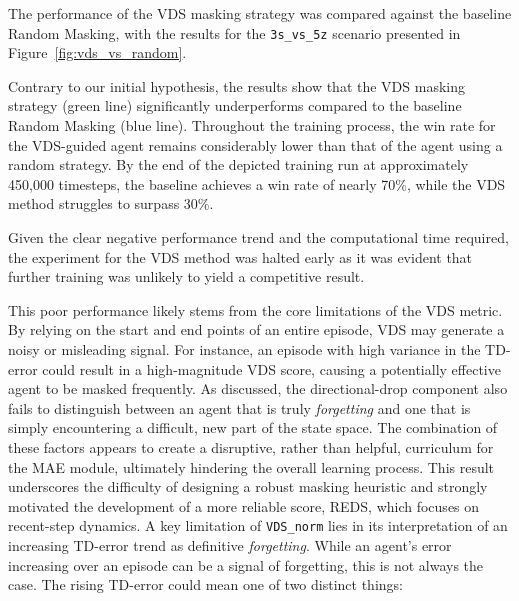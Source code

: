 The performance of the VDS masking strategy was compared against the baseline Random Masking, with the results for the \texttt{3s\_vs\_5z} scenario presented in Figure~\ref{fig:vds_vs_random}.

Contrary to our initial hypothesis, the results show that the VDS masking strategy (green line) significantly underperforms compared to the baseline Random Masking (blue line). Throughout the training process, the win rate for the VDS-guided agent remains considerably lower than that of the agent using a random strategy. By the end of the depicted training run at approximately 450,000 timesteps, the baseline achieves a win rate of nearly 70\%, while the VDS method struggles to surpass 30\%.

Given the clear negative performance trend and the computational time required, the experiment for the VDS method was halted early as it was evident that further training was unlikely to yield a competitive result.

This poor performance likely stems from the core limitations of the VDS metric. By relying on the start and end points of an entire episode, VDS may generate a noisy or misleading signal. For instance, an episode with high variance in the TD-error could result in a high-magnitude VDS score, causing a potentially effective agent to be masked frequently. As discussed, the directional-drop component also fails to distinguish between an agent that is truly \textit{forgetting } and one that is simply encountering a difficult, new part of the state space. The combination of these factors appears to create a disruptive, rather than helpful, curriculum for the MAE module, ultimately hindering the overall learning process. This result underscores the difficulty of designing a robust masking heuristic and strongly motivated the development of a more reliable score, REDS, which focuses on recent-step dynamics.
A key limitation of \texttt{VDS\_norm} lies in its interpretation of an increasing TD-error trend as definitive \textit{forgetting}. While an agent's error increasing over an episode can be a signal of forgetting, this is not always the case. The rising TD-error could mean one of two distinct things:

